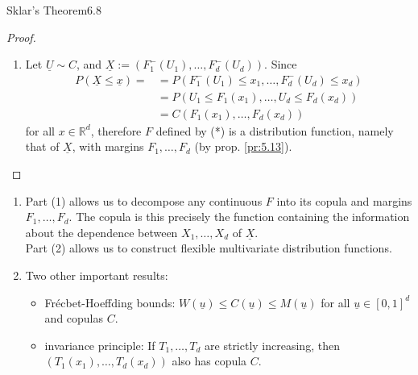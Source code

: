 \documentclass{article}
\newcommand{\R}{\mathbb{R}}
\begin{document}
\begin{mythm}{Sklar's Theorem}{6.8}
\begin{proof}
\begin{enumerate}
				\item Let $\underline{U}\sim C$, and $\underline{X}:=(F_1^-(U_1), \dots, F_d^-(U_d))$. Since
				\begin{align*}
					P(\underline{X}\leq\underline{x})=&=P(F_1^-(U_1)\leq x_1, \dots, F_d^-(U_d)\leq x_d)\\
					&=P(U_1\leq F_1(x_1), \dots, U_d\leq F_d(x_d))\\
					&=C(F_1(x_1), \dots, F_d(x_d))
				\end{align*}
				for all $x\in\R^d$, therefore $F$ defined by (*) is a distribution function, namely that of $\underline{X}$, with margins $F_1, \dots, F_d$ (by prop. \ref{pr:5.13}).
			\end{enumerate}
		\end{proof}
	\end{mythm}
	
	\begin{myrem}{}{}
		\begin{enumerate}
			\item Part (1) allows us to decompose any continuous $F$ into its copula and margins $F_1, \dots, F_d$. The copula is this precisely the function containing the information about the dependence between $X_1, \dots, X_d$ of $\underline{X}$.\\
			
			Part (2) allows us to construct flexible multivariate distribution functions.
			
			\item Two other important results:
			\begin{itemize}
				\item Fr\' ecbet-Hoeffding bounds: $W(\underline{u})\leq C(\underline{u})\leq M(\underline{u})$ for all $\underline{u}\in[0, 1]^d$ and copulas $C$.
				
				\item invariance principle: If $T_1, \dots, T_d$ are strictly increasing, then $(T_1(x_1), \dots, T_d(x_d))$ also has copula $C$.
			\end{itemize}
		\end{enumerate}
	\end{myrem}
	
\end{document}
